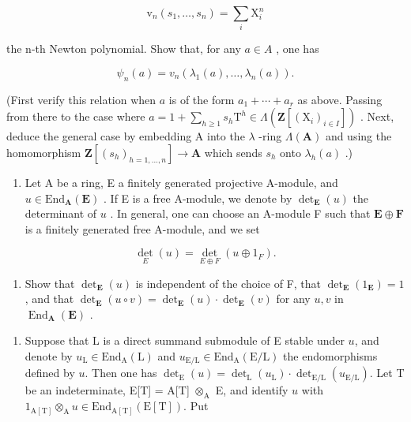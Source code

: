 \[
\mathrm{v} _ {n} (s _ {1}, \dots , s _ {n}) = \sum_ {i} \mathrm{X} _ {i} ^ {n}
\]

the n-th Newton polynomial. Show that, for any \(a \in A\) , one has

\[
\psi_ {n} (a) = v _ {n} \left(\lambda_ {1} (a), \dots , \lambda_ {n} (a)\right).
\]

(First verify this relation when \(a\) is of the form \(a_{1} + \cdots + a_{r}\) as above. Passing from there to the case where \(a = 1 + \sum_{h \geqslant 1} s_{h} \mathrm{T}^{h} \in \Lambda(\mathbf{Z}[(\mathrm{X}_{i})_{i \in I}])\) . Next, deduce the general case by embedding A into the \(\lambda\) -ring \(\Lambda(\mathbf{A})\) and using the homomorphism \(\mathbf{Z}[(s_{h})_{h=1,\ldots,n}] \to \mathbf{A}\) which sends \(s_{h}\) onto \(\lambda_{h}(a)\) .)

\begin{enumerate}
\def\labelenumi{\arabic{enumi})}
\setcounter{enumi}{48}
\tightlist
\item
  Let A be a ring, E a finitely generated projective A-module, and \(u \in \text{End}_{\mathbf{A}}(\mathbf{E})\) . If E is a free A-module, we denote by \(\det_{\mathbf{E}}(u)\) the determinant of \(u\) . In general, one can choose an A-module F such that \(\mathbf{E} \oplus \mathbf{F}\) is a finitely generated free A-module, and we set
\end{enumerate}

\[
\det _ {E} (u) = \det _ {E \oplus F} (u \oplus 1 _ {F}).
\]

\begin{enumerate}
\def\labelenumi{\alph{enumi})}
\tightlist
\item
  Show that \(\operatorname{det}_{\mathbf{E}}(u)\) is independent of the choice of F, that \(\operatorname{det}_{\mathbf{E}}(1_{\mathbf{E}}) = 1\) , and that \(\operatorname{det}_{\mathbf{E}}(u \circ v) = \operatorname{det}_{\mathbf{E}}(u) \cdot \operatorname{det}_{\mathbf{E}}(v)\) for any \(u, v\) in \(\operatorname{End}_{\mathbf{A}}(\mathbf{E})\) .
\end{enumerate}
\relax{}
\begin{enumerate}
\def\labelenumi{\alph{enumi})}
\setcounter{enumi}{1}
\tightlist
\item
  Suppose that L is a direct summand submodule of E stable under \(u\), and denote by \(u_{\mathrm{L}} \in \mathrm{End}_{\mathrm{A}}(\mathrm{L})\) and \(u_{\mathrm{E/L}} \in \mathrm{End}_{\mathrm{A}}(\mathrm{E/L})\) the endomorphisms defined by \(u\). Then one has \(\det_{\mathrm{E}}(u) = \det_{\mathrm{L}}(u_{\mathrm{L}}) \cdot \det_{\mathrm{E/L}}(u_{\mathrm{E/L}})\). Let T be an indeterminate, E{[}T{]} = A{[}T{]} \(\otimes_{\mathrm{A}}\) E, and identify \(u\) with \(1_{\mathrm{A[T]}} \otimes_{\mathrm{A}} u \in \mathrm{End}_{\mathrm{A[T]}}(\mathrm{E[T]})\). Put
\end{enumerate}

